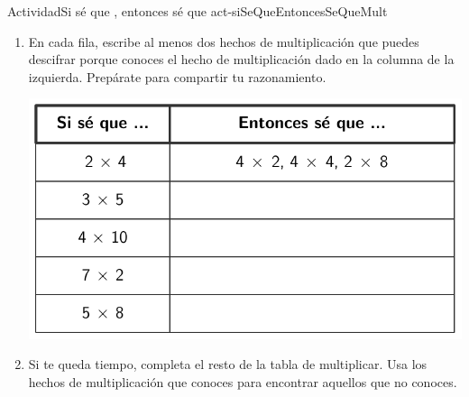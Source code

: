 \documentclass[14pt]{extarticle}
\begin{document}
\begin{activity}{Actividad}{Si sé que \textellipsis, entonces sé que \textellipsis}{act-siSeQueEntoncesSeQueMult}%
\begin{enumerate}
\item{}En cada fila, escribe al menos dos hechos de multiplicación que puedes descifrar porque conoces el hecho de multiplicación dado en la columna de la izquierda. Prepárate para compartir tu razonamiento.%
\begin{image}{0}{1}{0}{}%
\includegraphics[max width=\linewidth, center]{external/blm/tikz-source/siSeQueEntoncesSeQueMult-BLM-tab.pdf}
\end{image}%
\item{}Si te queda tiempo, completa el resto de la tabla de multiplicar. Usa los hechos de multiplicación que conoces para encontrar aquellos que no conoces.%
\end{enumerate}
\end{activity}
\end{document}
